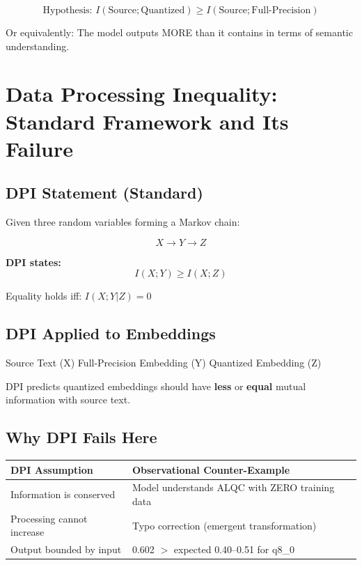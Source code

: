 \begin{equation}
\text{Hypothesis: } I(\text{Source};\text{Quantized}) \geq I(\text{Source};\text{Full-Precision})
\end{equation}

Or equivalently: The model outputs MORE than it contains in terms of semantic understanding.

\section{Data Processing Inequality: Standard Framework and Its Failure}

\subsection{DPI Statement (Standard)}

Given three random variables forming a Markov chain:

\begin{equation}
X \rightarrow Y \rightarrow Z
\end{equation}

\textbf{DPI states:}
\begin{equation}
I(X;Y) \geq I(X;Z)
\end{equation}

Equality holds iff: $I(X;Y|Z) = 0$

\subsection{DPI Applied to Embeddings}

\begin{center}
Source Text (X) \rightarrow Full-Precision Embedding (Y) \rightarrow Quantized Embedding (Z)
\end{center}

DPI predicts quantized embeddings should have \textbf{less} or \textbf{equal} mutual information with source text.

\subsection{Why DPI Fails Here}

\begin{table}[h]
\centering
\begin{tabular}{|p{}|p{}|}
\hline
\textbf{DPI Assumption} & \textbf{Observational Counter-Example} \\
\hline
Information is conserved & Model understands ALQC with ZERO training data \\
\hline
Processing cannot increase & Typo correction (emergent transformation) \\
\hline
Output bounded by input & 0.602 $>$ expected 0.40--0.51 for q8\_0 \\
\hline
\end{tabular}
\end{table}

